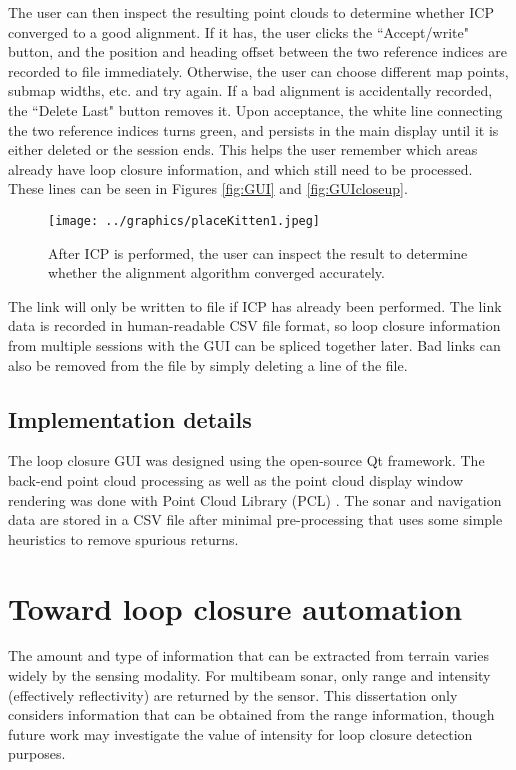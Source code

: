 The user can then inspect the resulting point clouds to determine whether ICP converged to a good alignment. If it has, the user clicks the ``Accept/write" button, and the position and heading offset between the two reference indices are recorded to file immediately. Otherwise, the user can choose different map points, submap widths, etc. and try again. If a bad alignment is accidentally recorded, the ``Delete Last" button removes it. Upon acceptance, the white line connecting the two reference indices turns green, and persists in the main display until it is either deleted or the session ends. This helps the user remember which areas already have loop closure information, and which still need to be processed. These lines can be seen in Figures \ref{fig:GUI} and \ref{fig:GUIcloseup}.

 \begin{figure}[htbp]
   \centering
   \texttt{[image: ../graphics/placeKitten1.jpeg]} %
   \caption{After ICP is performed, the user can inspect the result to determine whether the alignment algorithm converged accurately.}
   \label{fig:GUI_poseicp}
\end{figure}

The link will only be written to file if ICP has already been performed. The link data is recorded in human-readable CSV file format, so loop closure information from multiple sessions with the GUI can be spliced together later. Bad links can also be removed from the file by simply deleting a line of the file. 

\subsection{Implementation details}

The loop closure GUI was designed using the open-source Qt framework. The back-end point cloud processing as well as the point cloud display window rendering was done with Point Cloud Library (PCL) \cite{PCL}. The sonar and navigation data are stored in a CSV file after minimal pre-processing that uses some simple heuristics to remove spurious returns.

\section{Toward loop closure automation}

The amount and type of information that can be extracted from terrain varies widely by the sensing modality. For multibeam sonar, only range and intensity (effectively reflectivity) are returned by the sensor. This dissertation only considers information that can be obtained from the range information, though future work may investigate the value of intensity for loop closure detection purposes.

